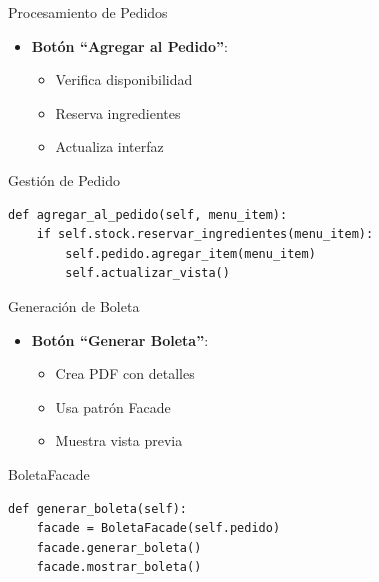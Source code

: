\documentclass[12pt]{beamer}
\begin{document}
\begin{frame}[fragile]{Procesamiento de Pedidos}
    \begin{itemize}
        \item \textbf{Botón ``Agregar al Pedido''}:
        \begin{itemize}
            \item Verifica disponibilidad
            \item Reserva ingredientes
            \item Actualiza interfaz
        \end{itemize}
    \end{itemize}
    \begin{exampleblock}{Gestión de Pedido}
        \begin{verbatim}
def agregar_al_pedido(self, menu_item):
    if self.stock.reservar_ingredientes(menu_item):
        self.pedido.agregar_item(menu_item)
        self.actualizar_vista()
        \end{verbatim}
    \end{exampleblock}
\end{frame}

\begin{frame}[fragile]{Generación de Boleta}
    \begin{itemize}
        \item \textbf{Botón ``Generar Boleta''}:
        \begin{itemize}
            \item Crea PDF con detalles
            \item Usa patrón Facade
            \item Muestra vista previa
        \end{itemize}
    \end{itemize}
    \begin{exampleblock}{BoletaFacade}
        \begin{verbatim}
def generar_boleta(self):
    facade = BoletaFacade(self.pedido)
    facade.generar_boleta()
    facade.mostrar_boleta()
        \end{verbatim}
    \end{exampleblock}
\end{frame}
\end{document}
